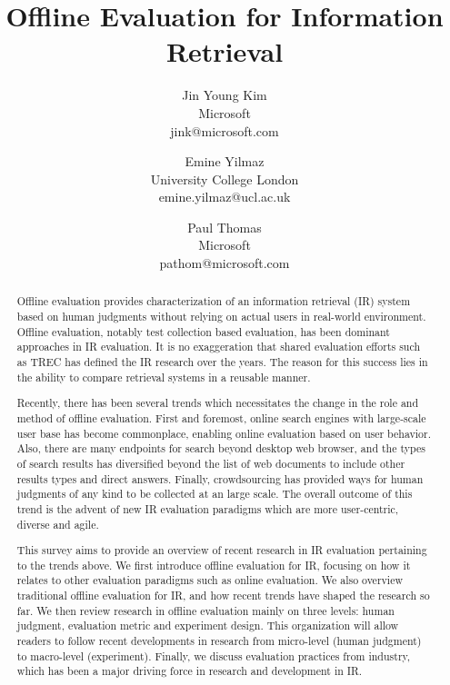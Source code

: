 \documentclass[openany]{now} %
\title{Offline Evaluation for Information Retrieval}
\author{
	Jin Young Kim \\
	Microsoft \\
	jink@microsoft.com
	\and
	Emine Yilmaz \\
	University College London \\
	emine.yilmaz@ucl.ac.uk
	\and
	Paul Thomas \\
	Microsoft \\
	pathom@microsoft.com
}
\begin{document}

\frontmatter  %

\maketitle

\tableofcontents

\mainmatter

\begin{abstract}
Offline evaluation provides characterization of an information retrieval (IR) system based on human judgments without relying on actual users in real-world environment. Offline evaluation, notably test collection based evaluation, has been dominant approaches in IR evaluation. It is no exaggeration that shared evaluation efforts such as TREC has defined the IR research over the years. The reason for this success lies in the ability to compare retrieval systems in a reusable manner.

Recently, there has been several trends which necessitates the change in the role and method of offline evaluation. First and foremost, online search engines with large-scale user base has become commonplace, enabling online evaluation based on user behavior. Also, there are many endpoints for search beyond desktop web browser, and the types of search results has diversified beyond the list of web documents to include other results types and direct answers. Finally, crowdsourcing has provided ways for human judgments of any kind to be collected at an large scale. The overall outcome of this trend is the advent of new IR evaluation paradigms which are more user-centric, diverse and agile.

This survey aims to provide an overview of recent research in IR evaluation pertaining to the trends above. We first introduce offline evaluation for IR, focusing on how it relates to other evaluation paradigms such as online evaluation. We also overview traditional offline evaluation for IR, and how recent trends have shaped the research so far. We then review research in offline evaluation mainly on three levels: human judgment, evaluation metric and experiment design. This organization will allow readers to follow recent developments in research from micro-level (human judgment) to macro-level (experiment). Finally, we discuss evaluation practices from industry, which has been a major driving force in research and development in IR.


\end{abstract}
\end{document}
